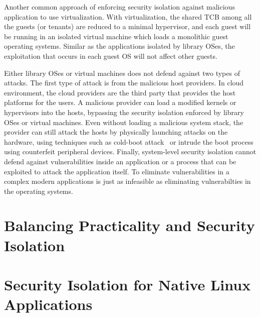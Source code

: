 Another common approach of enforcing security isolation against malicious application to use virtualization.
With virtualization, the shared TCB among all the guests (or tenants)
are reduced to a minimal hypervisor,
and each guest will be running in an isolated virtual machine which loads a monolithic guest operating systems.
Similar as the applications isolated by library OSes, the exploitation that occurs in each guest OS will not affect other guests.

Either library OSes or virtual machines does not defend against two types of attacks.
The first type of attack is from the malicious host providers.
In cloud environment, the cloud providers are the third party that provides the host platforms for the users.
A malicious provider can load a modified kernels or hypervisors
into the hosts,
bypassing the security isolation enforced by library OSes or virtual machines.
Even without loading a malicious system stack,
the provider can still attack the hosts by physically launching attacks on the hardware, using techniques such as cold-boot attack~\citep{halderman09coldboot} or 
intrude the boot process using counterfeit peripheral devices.
Finally, system-level security isolation cannot defend against vulnerabilities
inside an application or a process
that can be exploited to attack the application itself.
To eliminate vulnerabilities in a complex modern applications is just as infeasible as eliminating vulnerabilties in the operating systems.



\section{Balancing Practicality and Security Isolation}
\label{sec:intro:practicality}


\section{Security Isolation for Native Linux Applications}
\label{sec:intro:graphene}

